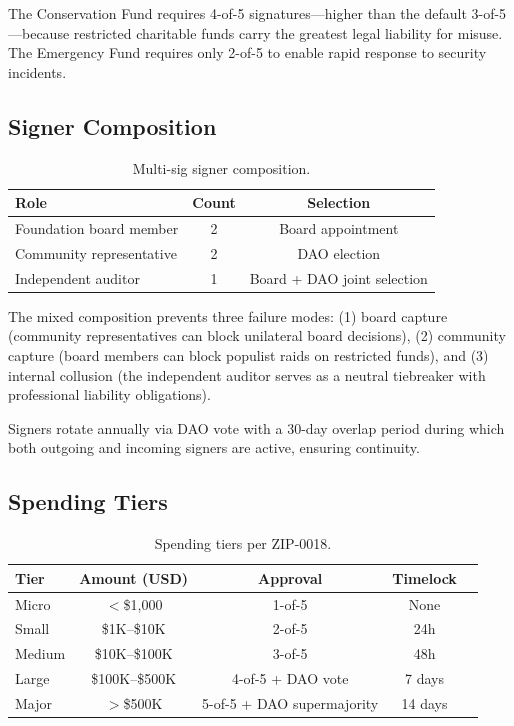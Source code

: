 \documentclass[11pt,letterpaper]{article}
\begin{document}
The Conservation Fund requires 4-of-5 signatures---higher than the default 3-of-5---because restricted charitable funds carry the greatest legal liability for misuse. The Emergency Fund requires only 2-of-5 to enable rapid response to security incidents.

\subsection{Signer Composition}

\begin{table}[t]
\centering
\begin{tabular}{lcc}
\toprule
\textbf{Role} & \textbf{Count} & \textbf{Selection} \\
\midrule
Foundation board member & 2 & Board appointment \\
Community representative & 2 & DAO election \\
Independent auditor & 1 & Board + DAO joint selection \\
\bottomrule
\end{tabular}
\caption{Multi-sig signer composition.}
\label{tab:signers}
\end{table}

The mixed composition prevents three failure modes: (1) board capture (community representatives can block unilateral board decisions), (2) community capture (board members can block populist raids on restricted funds), and (3) internal collusion (the independent auditor serves as a neutral tiebreaker with professional liability obligations).

Signers rotate annually via DAO vote with a 30-day overlap period during which both outgoing and incoming signers are active, ensuring continuity.

\subsection{Spending Tiers}

\begin{table}[t]
\centering
\begin{tabular}{lcccc}
\toprule
\textbf{Tier} & \textbf{Amount (USD)} & \textbf{Approval} & \textbf{Timelock} \\
\midrule
Micro & $<$\$1{,}000 & 1-of-5 & None \\
Small & \$1K--\$10K & 2-of-5 & 24h \\
Medium & \$10K--\$100K & 3-of-5 & 48h \\
Large & \$100K--\$500K & 4-of-5 + DAO vote & 7 days \\
Major & $>$\$500K & 5-of-5 + DAO supermajority & 14 days \\
\bottomrule
\end{tabular}
\caption{Spending tiers per ZIP-0018.}
\label{tab:tiers}
\end{table}
\end{document}
